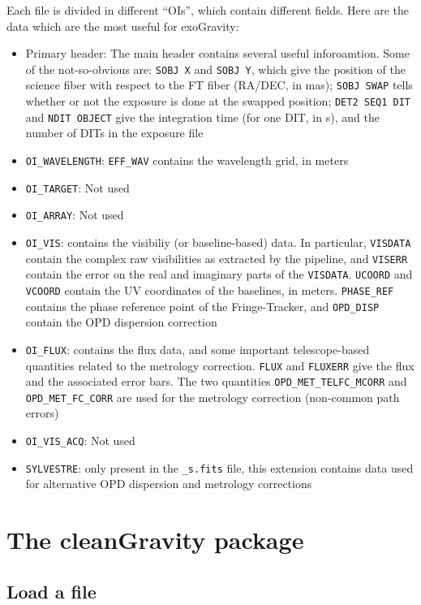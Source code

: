 Each file is divided in different ``OIs'', which contain different fields. Here are the data which are the most useful for exoGravity:
\begin{itemize}
\item{Primary header: The main header contains several useful inforoamtion. Some of the not-so-obvious are: \verb|SOBJ X| and \verb|SOBJ Y|, which give the position of the science fiber with respect to the FT fiber (RA/DEC, in mas); \verb|SOBJ SWAP| tells whether or not the exposure is done at the swapped position; \verb|DET2 SEQ1 DIT| and \verb|NDIT OBJECT| give the integration time (for one DIT, in s), and the number of DITs in the exposure file}
\item{\verb|OI_WAVELENGTH|: \verb|EFF_WAV| contains the wavelength grid, in meters}
\item{\verb|OI_TARGET|: Not used}
\item{\verb|OI_ARRAY|: Not used}
\item{\verb|OI_VIS|: contains the visibiliy (or baseline-based) data. In particular, \verb|VISDATA| contain the complex raw visibilities as extracted by the pipeline, and \verb|VISERR| contain the error on the real and imaginary parts of the \verb|VISDATA|. \verb|UCOORD| and \verb|VCOORD| contain the UV coordinates of the baselines, in meters. \verb|PHASE_REF| contains the phase reference point of the Fringe-Tracker, and \verb|OPD_DISP| contain the OPD dispersion correction}
\item{\verb|OI_FLUX|: contains the flux data, and some important telescope-based quantities related to the metrology correction. \verb|FLUX| and \verb|FLUXERR| give the flux and the associated error bars. The two quantities \verb|OPD_MET_TELFC_MCORR| and \verb|OPD_MET_FC_CORR| are used for the metrology correction (non-common path errors)}
\item{\verb|OI_VIS_ACQ|: Not used}
\item{\verb|SYLVESTRE|: only present in the \verb|_s.fits| file, this extension contains data used for alternative OPD dispersion and metrology corrections}
\end{itemize}



\section{The cleanGravity package}

\subsection{Load a file}

